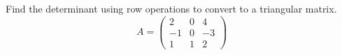\documentclass{ximera}
\author{Parisa Fatheddin}
\begin{document}
\begin{exercise}


Find the determinant using row operations to convert to a triangular matrix. 
\[
A = \begin{pmatrix}
2 & 0 & 4\\
-1 & 0 & -3\\
1 & 1 & 2 
\end{pmatrix}
\]


































\end{exercise}
\end{document}
